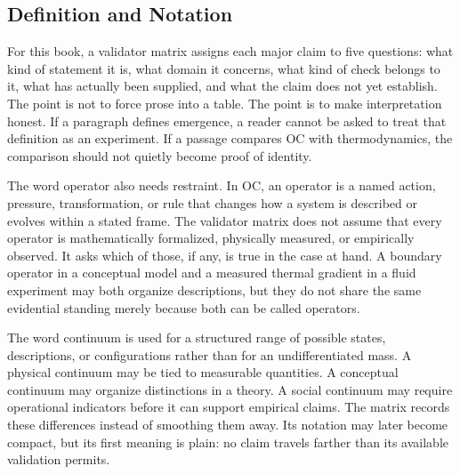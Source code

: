 \documentclass[11pt,a4paper,openany]{book}
\begin{document}
\subsection{Definition and Notation}
For this book, a validator matrix assigns each major claim to five questions: what kind of statement it is, what domain it concerns, what kind of check belongs to it, what has actually been supplied, and what the claim does not yet establish. The point is not to force prose into a table. The point is to make interpretation honest. If a paragraph defines emergence, a reader cannot be asked to treat that definition as an experiment. If a passage compares OC with thermodynamics, the comparison should not quietly become proof of identity. \cite{landau_stat_physics,prigogine_dissipative}\par
The word operator also needs restraint. In OC, an operator is a named action, pressure, transformation, or rule that changes how a system is described or evolves within a stated frame. The validator matrix does not assume that every operator is mathematically formalized, physically measured, or empirically observed. It asks which of those, if any, is true in the case at hand. A boundary operator in a conceptual model and a measured thermal gradient in a fluid experiment may both organize descriptions, but they do not share the same evidential standing merely because both can be called operators.\par
The word continuum is used for a structured range of possible states, descriptions, or configurations rather than for an undifferentiated mass. A physical continuum may be tied to measurable quantities. A conceptual continuum may organize distinctions in a theory. A social continuum may require operational indicators before it can support empirical claims. The matrix records these differences instead of smoothing them away. Its notation may later become compact, but its first meaning is plain: no claim travels farther than its available validation permits.\par
\end{document}
